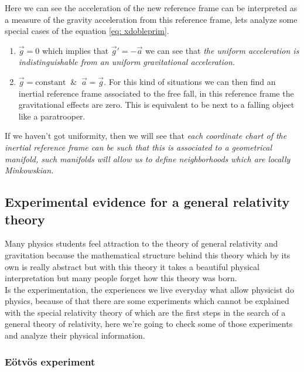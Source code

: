         Here we can see the acceleration of the new reference frame can be interpreted as a measure of the gravity acceleration from this reference frame, lets analyze some special cases of the equation \ref{eq: xdobleprim}.

        \begin{enumerate}
            \item $\Vec{g} = 0$ which implies that $\Vec{g}' = - \Vec{a}$ we can see that \textit{the uniform acceleration is indistinguishable from an uniform gravitational acceleration.}

            \item $\Vec{g} = \text{constant} \;\; \& \;\; \Vec{a} = \Vec{g}$. For this kind of situations we can then find an inertial reference frame associated to the free fall, in this reference frame the gravitational effects are zero. This is equivalent to be next to a falling object like a paratrooper. 
        \end{enumerate}

        If we haven't got uniformity, then we will see that \textit{each coordinate chart of the inertial reference frame can be such that this is associated to a geometrical manifold, such manifolds will allow us to define neighborhoods which are locally Minkowskian.}

    \subsection{Experimental evidence for a general relativity theory}

        Many physics students feel attraction to the theory of general relativity and gravitation because the mathematical structure behind this theory which by its own is really abstract but with this theory it takes a beautiful physical interpretation but many people forget how this theory was born. \\

        Is the experimentation, the experiences we live everyday what allow physicist do physics, because of that there are some experiments which cannot be explained with the special relativity theory of which are the first steps in the search of a general theory of relativity, here we're going to check some of those experiments and analyze their physical information.

        \subsubsection{Eötvös experiment}

